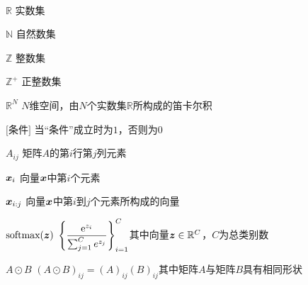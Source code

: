 \clearpage


\titlespacing{\chapter}{0pt}{0mm}{5mm}



\begin{labeling}{~~~~~~~~~~~~~~~~~~~~~}
\setlength{\parskip}{0pt plus1pt minus1pt}
\item [$\mathbb{R}$] 实数集
\item [$\mathbb{N}$] 自然数集
\item [$\mathbb{Z}$] 整数集
\item [$\mathbb{Z}^+$] 正整数集
\item [$\mathbb{R}^N$] $N$维空间，由$N$个实数集$\mathbb{R}$所构成的笛卡尔积
\item [$\text{[条件]}$] 当“条件”成立时为$1$，否则为$0$
\item [$A_{ij}$] 矩阵$A$的第$i$行第$j$列元素
\item [$\boldsymbol{x}_i$] 向量$\boldsymbol{x}$中第$i$个元素
\item [$\boldsymbol{x}_{i:j}$] 向量$\boldsymbol{x}$中第$i$到$j$个元素所构成的向量
\item [$\text{softmax}(\boldsymbol{z})$] $\displaystyle\left\{\frac{\mathrm{e}^{z_i}}{\sum_{j=1}^Ce^{z_j}}\right\}_{i=1}^C$其中向量$\boldsymbol{z}\in\mathbb{R}^{C}$，$C$为总类别数
\item [$A\odot B$] $(A\odot B)_{ij} = (A)_{ij}(B)_{ij}$其中矩阵$A$与矩阵$B$具有相同形状

\end{labeling}
\titlespacing{\chapter}{0pt}{-6mm}{5mm}
\let\cleardoublepage\clearpage  %
